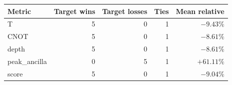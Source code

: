 \begin{tabular}{lrrrr}
\toprule
Metric & Target wins & Target losses & Ties & Mean relative \\
\midrule
T & 5 & 0 & 1 & $-9.43\%$ \\
CNOT & 5 & 0 & 1 & $-8.61\%$ \\
depth & 5 & 0 & 1 & $-8.61\%$ \\
peak_ancilla & 0 & 5 & 1 & $+61.11\%$ \\
score & 5 & 0 & 1 & $-9.04\%$ \\
\bottomrule
\end{tabular}
